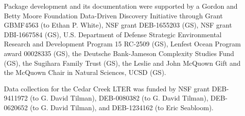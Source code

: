 \documentclass[article]{jss}
\begin{document}
Package development and its documentation were supported by a Gordon and Betty Moore Foundation Data-Driven Discovery Initiative through Grant GBMF4563 (to Ethan P. White), NSF grant DEB-1655203 (GS), NSF grant DBI-1667584 (GS), U.S. Department of Defense Strategic Environmental Research and Development Program 15 RC-2509 (GS), Lenfest Ocean Program award 00028335 (GS), the Deutsche Bank-Jameson Complexity Studies Fund (GS), the Sugihara Family Trust (GS), the Leslie and John McQuown Gift and the McQuown Chair in Natural Sciences, UCSD (GS).

Data collection for the Cedar Creek LTER was funded by NSF grant DEB-9411972 (to G. David Tilman), DEB-0080382 (to G. David Tilman), DEB-0620652 (to G. David Tilman), and DEB-1234162 (to Eric Seabloom).

\newpage





\end{document}
